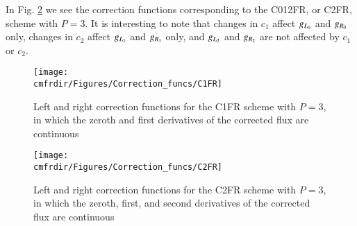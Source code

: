 In Fig. \ref{fig:c2_corfunc} we see the correction functions corresponding to the C012FR, or C2FR, scheme with $P=3$. It is interesting to note that changes in $c_1$ affect $\gL[0]$ and $\gR[0]$ only, changes in $c_2$ affect $\gL[1]$ and $\gR[1]$ only, and $\gL[2]$ and $\gR[2]$ are not affected by $c_1$ or $c_2$.

\begin{figure}[h]
\hspace{-1.25 cm}
\centering\texttt{[image: \\cmfrdir/Figures/Correction\_funcs/C1FR]}
\caption{Left and right correction functions for the C1FR scheme with $P=3$, in which the zeroth and first derivatives of the corrected flux are continuous}
\label{fig:c1_corfunc}
\end{figure}

\begin{figure}[h]
\centering \texttt{[image: \\cmfrdir/Figures/Correction\_funcs/C2FR]} \caption{Left and right correction functions for the C2FR scheme with $P=3$, in which the zeroth, first, and second derivatives of the corrected flux are continuous} \label{fig:c2_corfunc} 
\end{figure}





